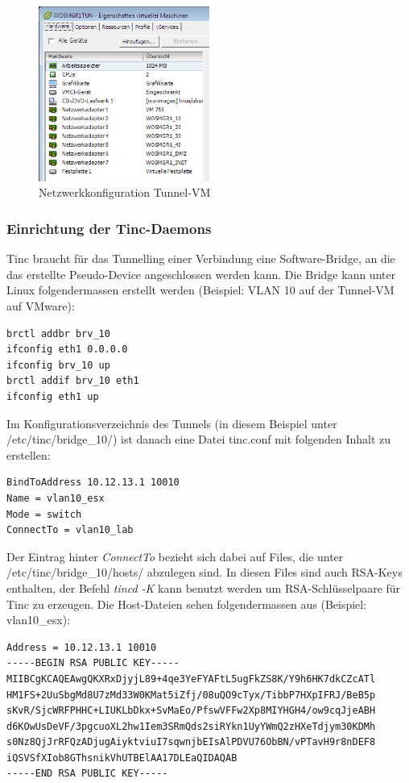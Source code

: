 \begin{figure}[H]
\centering
\includegraphics[width=0.5\textwidth]{Phase2/tinc_wosmgr1tun.png}
\caption{Netzwerkkonfiguration Tunnel-VM}
\label{fig:tinc-esx-tunvm}
\end{figure}

\subsubsection{Einrichtung der Tinc-Daemons}
Tinc braucht für das Tunnelling einer Verbindung eine Software-Bridge, an die das erstellte Pseudo-Device angeschlossen werden kann. Die Bridge kann unter Linux folgendermassen erstellt werden (Beispiel: VLAN 10 auf der Tunnel-VM auf VMware):

\begin{lstlisting}
brctl addbr brv_10
ifconfig eth1 0.0.0.0
ifconfig brv_10 up
brctl addif brv_10 eth1
ifconfig eth1 up
\end{lstlisting}

Im Konfigurationsverzeichnis des Tunnels (in diesem Beispiel unter /etc/tinc/bridge\_10/) ist danach eine Datei tinc.conf mit folgenden Inhalt zu erstellen:

\begin{lstlisting}
BindToAddress 10.12.13.1 10010
Name = vlan10_esx
Mode = switch
ConnectTo = vlan10_lab
\end{lstlisting}

Der Eintrag hinter \emph{ConnectTo} bezieht sich dabei auf Files, die unter /etc/tinc/bridge\_10/hosts/ abzulegen sind. In diesen Files sind auch RSA-Keys enthalten, der Befehl \emph{tincd -K} kann benutzt werden um RSA-Schlüsselpaare für Tinc zu erzeugen. Die Host-Dateien sehen folgendermassen aus (Beispiel: vlan10\_esx):

\begin{lstlisting}
Address = 10.12.13.1 10010
-----BEGIN RSA PUBLIC KEY-----
MIIBCgKCAQEAwgQKXRxDjyjL89+4qe3YeFYAFtL5ugFkZS8K/Y9h6HK7dkCZcATl
HM1FS+2UuSbgMd8U7zMd33W0KMat5iZfj/08uQO9cTyx/TibbP7HXpIFRJ/BeB5p
sKvR/SjcWRFPHHC+LIUKLbDkx+SvMaEo/PfswVFFw2Xp8MIYHGH4/ow9cqJjeABH
d6KOwUsDeVF/3pgcuoXL2hw1Iem3SRmQds2siRYkn1UyYWmQ2zHXeTdjym30KDMh
s0Nz8QjJrRFQzADjugAiyktviuI7sqwnjbEIsAlPDVU76ObBN/vPTavH9r8nDEF8
iQSVSfXIob8GThsnikVhUTBElAA17DLEaQIDAQAB
-----END RSA PUBLIC KEY-----
\end{lstlisting}

